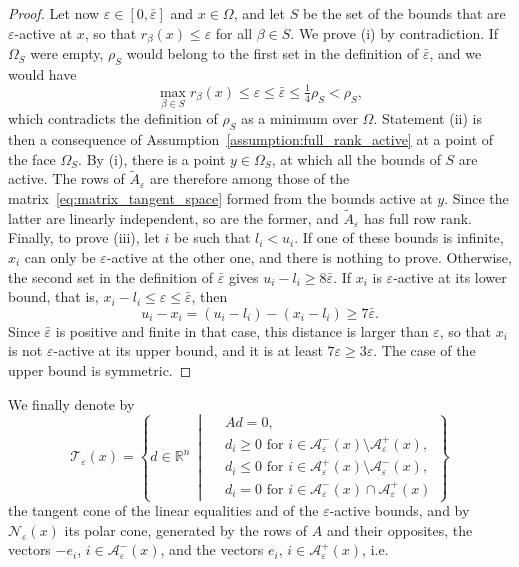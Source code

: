 \documentclass[pdflatex,sn-mathphys-num]{sn-jnl}%
\theoremstyle{thmstyleone}%
\newcommand{\RR}{{\mathbb{R}}} %
\newcommand{\calA}{{\mathcal{A}}}
\newcommand{\calN}{{\mathcal{N}}}
\newcommand{\calT}{{\mathcal{T}}}
\begin{document}
\begin{proof}
	Let now $\varepsilon \in [0,\bar\varepsilon]$ and $x \in \Omega$, and let $S$ be the set of the bounds that are $\varepsilon$-active at $x$, so that $r_\beta(x) \le \varepsilon$ for all $\beta \in S$. We prove (i) by contradiction. If $\Omega_S$ were empty, $\rho_S$ would belong to the first set in the definition of $\bar\varepsilon$, and we would have
	\[\max_{\beta\in S} r_\beta(x) \le \varepsilon \le \bar\varepsilon \le \tfrac{1}{4}\rho_S < \rho_S,\]
	which contradicts the definition of $\rho_S$ as a minimum over $\Omega$. Statement (ii) is then a consequence of Assumption~\ref{assumption:full_rank_active} at a point of the face $\Omega_S$. By (i), there is a point $y \in \Omega_S$, at which all the bounds of $S$ are active. The rows of $\tilde{A}_\varepsilon$ are therefore among those of the matrix~\eqref{eq:matrix_tangent_space} formed from the bounds active at $y$. Since the latter are linearly independent, so are the former, and $\tilde{A}_\varepsilon$ has full row rank. Finally, to prove (iii), let $i$ be such that $l_i < u_i$. If one of these bounds is infinite, $x_i$ can only be $\varepsilon$-active at the other one, and there is nothing to prove. Otherwise, the second set in the definition of $\bar\varepsilon$ gives $u_i - l_i \ge 8\bar\varepsilon$. If $x_i$ is $\varepsilon$-active at its lower bound, that is, $x_i - l_i \le \varepsilon \le \bar\varepsilon$, then
	\[u_i - x_i = (u_i - l_i) - (x_i - l_i) \ge 7\bar\varepsilon.\]
	Since $\bar\varepsilon$ is positive and finite in that case, this distance is larger than $\varepsilon$, so that $x_i$ is not $\varepsilon$-active at its upper bound, and it is at least $7\varepsilon \ge 3\varepsilon$. The case of the upper bound is symmetric.
\end{proof}
We finally denote by
\begin{equation}\label{eq:tangent_cone_eps}
	\calT_\varepsilon(x) = \left\{ d \in \RR^n \ \middle| \ \begin{aligned} & Ad = 0, \\ & d_i \ge 0 \text{ for } i \in \calA^-_\varepsilon(x)\setminus\calA^+_\varepsilon(x), \\ & d_i \le 0 \text{ for } i \in \calA^+_\varepsilon(x)\setminus\calA^-_\varepsilon(x), \\ 
	& d_i = 0 \text{ for } i \in \calA^-_\varepsilon(x)\cap\calA^+_\varepsilon(x) \end{aligned} \right\}
\end{equation}
the tangent cone of the linear equalities and of the $\varepsilon$-active bounds, and by $\calN_\varepsilon(x)$ its polar cone, generated by the rows of $A$ and their opposites, the vectors $-e_i$, $i \in \calA^-_\varepsilon(x)$, and the vectors $e_i$, $i \in \calA^+_\varepsilon(x)$, i.e.
\end{document}
